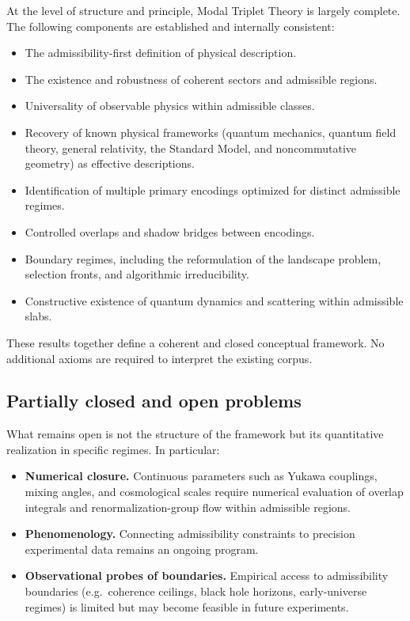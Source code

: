\documentclass[11pt]{article}
\begin{document}
At the level of structure and principle, Modal Triplet Theory is largely complete. The following components are established and internally consistent:

\begin{itemize}
\item The admissibility-first definition of physical description.
\item The existence and robustness of coherent sectors and admissible regions.
\item Universality of observable physics within admissible classes.
\item Recovery of known physical frameworks (quantum mechanics, quantum field theory, general relativity, the Standard Model, and noncommutative geometry) as effective descriptions.
\item Identification of multiple primary encodings optimized for distinct admissible regimes.
\item Controlled overlaps and shadow bridges between encodings.
\item Boundary regimes, including the reformulation of the landscape problem, selection fronts, and algorithmic irreducibility.
\item Constructive existence of quantum dynamics and scattering within admissible slabs.
\end{itemize}

These results together define a coherent and closed conceptual framework. No additional axioms are required to interpret the existing corpus.

\subsection{Partially closed and open problems}

What remains open is not the structure of the framework but its quantitative realization in specific regimes. In particular:

\begin{itemize}
\item \textbf{Numerical closure.}  
  Continuous parameters such as Yukawa couplings, mixing angles, and cosmological scales require numerical evaluation of overlap integrals and renormalization-group flow within admissible regions.
\item \textbf{Phenomenology.}  
  Connecting admissibility constraints to precision experimental data remains an ongoing program.
\item \textbf{Observational probes of boundaries.}  
  Empirical access to admissibility boundaries (e.g.\ coherence ceilings, black hole horizons, early-universe regimes) is limited but may become feasible in future experiments.
\end{itemize}
\end{document}
